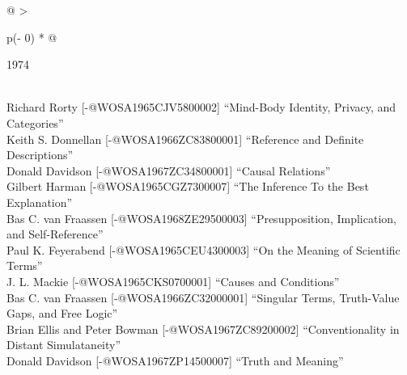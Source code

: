 \documentclass[
  10pt,
  letterpaper,
  DIV=11,
  numbers=noendperiod,
  twoside]{scrartcl}
\begin{document}
\begin{longtable}[]{@{}
  >{\raggedright\arraybackslash}p{(\columnwidth - 0\tabcolsep) * }@{}}

\caption{\label{tbl-top-ten-1965}Most cited articles published less than
ten years ago as of 1974.}

\tabularnewline

\toprule\noalign{}
\begin{minipage}[b]{\linewidth}\raggedright
1974
\end{minipage} \\
\midrule\noalign{}
\endhead
\bottomrule\noalign{}
\endlastfoot
Richard Rorty {[}-@WOSA1965CJV5800002{]} ``Mind-Body Identity, Privacy,
and Categories'' \\
Keith S. Donnellan {[}-@WOSA1966ZC83800001{]} ``Reference and Definite
Descriptions'' \\
Donald Davidson {[}-@WOSA1967ZC34800001{]} ``Causal Relations'' \\
Gilbert Harman {[}-@WOSA1965CGZ7300007{]} ``The Inference To the Best
Explanation'' \\
Bas C. van Fraassen {[}-@WOSA1968ZE29500003{]} ``Presupposition,
Implication, and Self-Reference'' \\
Paul K. Feyerabend {[}-@WOSA1965CEU4300003{]} ``On the Meaning of
Scientific Terms'' \\
J. L. Mackie {[}-@WOSA1965CKS0700001{]} ``Causes and Conditions'' \\
Bas C. van Fraassen {[}-@WOSA1966ZC32000001{]} ``Singular Terms,
Truth-Value Gaps, and Free Logic'' \\
Brian Ellis and Peter Bowman {[}-@WOSA1967ZC89200002{]}
``Conventionality in Distant Simulataneity'' \\
Donald Davidson {[}-@WOSA1967ZP14500007{]} ``Truth and Meaning'' \\

\end{longtable}
\end{document}
